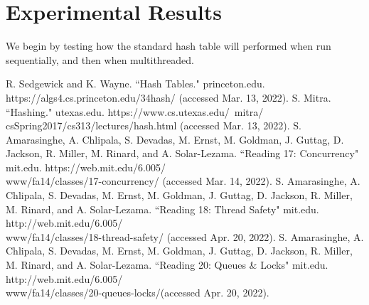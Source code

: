 \documentclass[conference]{IEEEtran}
\begin{document}
\section{Experimental Results}
We begin by testing how the standard hash table will performed when run sequentially, and then when multithreaded.

\begin{thebibliography}{00}
 R. Sedgewick and K. Wayne. ``Hash Tables." princeton.edu. \\https://algs4.cs.princeton.edu/34hash/ (accessed Mar. 13, 2022).
 S. Mitra. ``Hashing." utexas.edu. https://www.cs.utexas.edu/~mitra/\\csSpring2017/cs313/lectures/hash.html (accessed Mar. 13, 2022).
 S. Amarasinghe, A. Chlipala, S. Devadas, M. Ernst, M. Goldman, J. Guttag, D. Jackson, R. Miller, M. Rinard, and A. Solar-Lezama. ``Reading 17: Concurrency"
mit.edu. https://web.mit.edu/6.005/\\www/fa14/classes/17-concurrency/ (accessed Mar. 14, 2022).
 S. Amarasinghe, A. Chlipala, S. Devadas, M. Ernst, M. Goldman, J. Guttag, D. Jackson, R. Miller, M. Rinard, and A. Solar-Lezama. ``Reading 18: Thread Safety"
mit.edu. http://web.mit.edu/6.005/\\www/fa14/classes/18-thread-safety/ (accessed Apr. 20, 2022).
 S. Amarasinghe, A. Chlipala, S. Devadas, M. Ernst, M. Goldman, J. Guttag, D. Jackson, R. Miller, M. Rinard, and A. Solar-Lezama. ``Reading 20: Queues \& Locks"
mit.edu. http://web.mit.edu/6.005/\\www/fa14/classes/20-queues-locks/(accessed Apr. 20, 2022).
\end{thebibliography}
\end{document}
